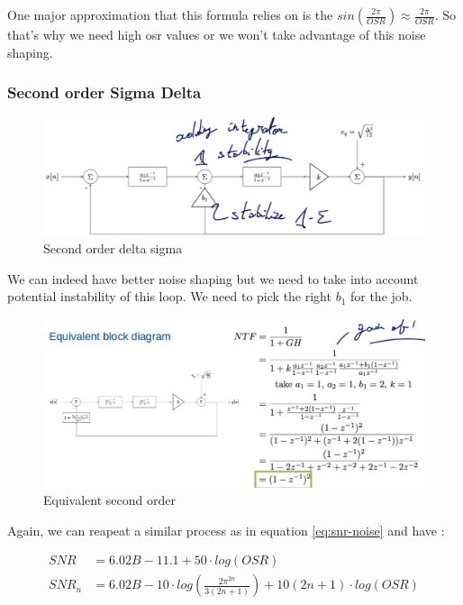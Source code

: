 \documentclass[
  a4paper,
]{article}
\begin{document}
One major approximation that this formula relies on is the
\(sin\left(\frac{2\pi}{OSR}\right) \approx \frac{2\pi}{OSR}\). So that's
why we need high {osr} values or we won't take advantage of this noise
shaping.

\hypertarget{second-order-sigma-delta}{%
\subsubsection{Second order Sigma
Delta}\label{second-order-sigma-delta}}

\begin{figure}
\hypertarget{fig:2-order-label}{%
\centering
\includegraphics{second_order.png}
\caption{Second order delta sigma}\label{fig:2-order-label}
}
\end{figure}

We can indeed have better noise shaping but we need to take into account
potential instability of this loop. We need to pick the right \(b_1\)
for the job.

\begin{figure}
\hypertarget{fig:equi-2-order-label}{%
\centering
\includegraphics{equi_second_order.png}
\caption{Equivalent second order}\label{fig:equi-2-order-label}
}
\end{figure}

Again, we can reapeat a similar process as in equation
\protect\hyperlink{eq:snr-noise}{{[}eq:snr-noise{]}} and have :

\[\begin{aligned}
    SNR &= 6.02B-11.1 +50\cdot log(OSR)\\
    SNR_n &= 6.02B- 10\cdot log \left( \frac{2\pi^{2n}}{3(2n+1)} \right) +10(2n+1)\cdot log(OSR)
\end{aligned}\]
\end{document}
